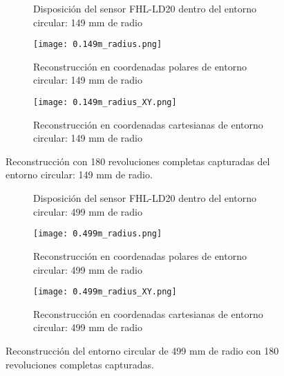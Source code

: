 \begin{figure}[H]
	\centering
	\begin{subfigure}{\textwidth}
		\centering
		\caption{Disposición del sensor FHL-LD20 dentro del entorno circular: 149 mm de radio}
		\label{fig:disposicion_lidar_var1}
		\vspace{1em}
	\end{subfigure}
	\begin{subfigure}{0.45\textwidth}
		\centering
		\texttt{[image: 0.149m\_radius.png]}
		\caption{Reconstrucción en coordenadas polares de entorno circular: 149 mm de radio}
		\label{fig:149m_radius_xy}
	\end{subfigure}
	\hspace{1em}
	\begin{subfigure}{0.45\textwidth}
		\centering
		\texttt{[image: 0.149m\_radius\_XY.png]}
		\caption{Reconstrucción en coordenadas cartesianas de entorno circular: 149 mm de radio}
		\label{fig:149m_radius}
	\end{subfigure}
	\caption{Reconstrucción con 180 revoluciones completas capturadas del entorno circular: 149 mm de radio.}
	\label{fig:disposicion_lidar_var_dist1}
\end{figure}

\begin{figure}[H]
	\centering
	\begin{subfigure}{\textwidth}
		\centering
		\caption{Disposición del sensor FHL-LD20 dentro del entorno circular: 499 mm de radio}
		\label{fig:disposicion_lidar_var8}
		\vspace{1em}
	\end{subfigure}
	\begin{subfigure}{0.45\textwidth}
		\centering
		\texttt{[image: 0.499m\_radius.png]}
		\caption{Reconstrucción en coordenadas polares de entorno circular: 499 mm de radio}
		\label{fig:499m_radius_xy}
	\end{subfigure}
	\hspace{1em}
	\begin{subfigure}{0.45\textwidth}
		\centering
		\texttt{[image: 0.499m\_radius\_XY.png]}
		\caption{Reconstrucción en coordenadas cartesianas de entorno circular: 499 mm de radio}
		\label{fig:499m_radius}
	\end{subfigure}
	\caption{Reconstrucción del entorno circular de 499 mm de radio con 180 revoluciones completas capturadas.}
	\label{fig:disposicion_lidar_var_dist8}
\end{figure}

